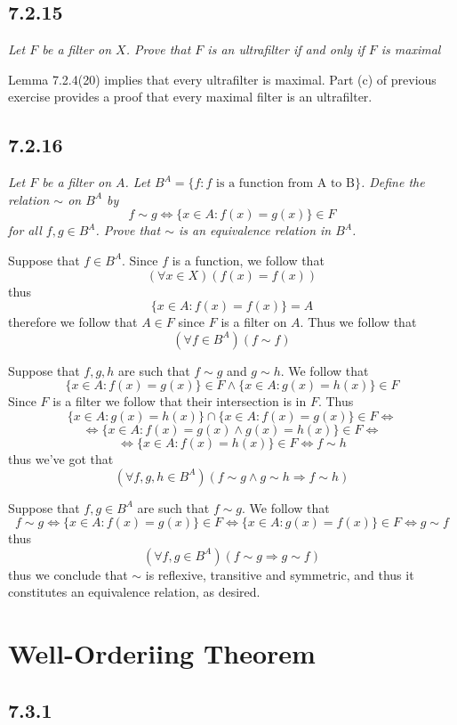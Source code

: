 \documentclass[11pt,oneside,titlepage]{book}
\DeclareMathOperator \lra {\Leftrightarrow}
\DeclareMathOperator \ra {\Rightarrow}
\newcommand{\set}[1]{\{ #1 \}}
\begin{document}
\subsection*{7.2.15}

\textit{Let $F$ be a filter on $X$. Prove that $F$ is an ultrafilter if and only if $F$ is
  maximal}

Lemma 7.2.4(20) implies that every ultrafilter is maximal. Part (c) of previous exercise provides
a proof that every maximal filter is an ultrafilter.

\subsection*{7.2.16}

\textit{Let $F$ be a filter on $A$. Let $B^A = \set{f: f \text{ is a function from A to B}}$.
Define the relation $\sim$ on $B^A$ by
$$f \sim g \iff \set{x \in A: f(x) = g(x)} \in F$$
for all $f, g \in B^A$. Prove that $\sim$ is an equivalence relation in $B^A$.}

Suppose that $f\in B^A$. Since $f$ is a function, we follow that
$$(\forall x \in X)(f(x) = f(x))$$
thus
$$\set{x \in A: f(x) = f(x)} = A$$
therefore we follow that $A \in F$ since $F$ is a filter on $A$. Thus we follow that
$$(\forall f \in B^A)(f \sim f)$$

Suppose that $f, g, h$ are such that $f \sim g$ and $g \sim h$. We follow that
$$\set{x \in A: f(x) = g(x)} \in F \land \set{x \in A: g(x) = h(x)} \in F $$
Since $F$ is a filter we follow that their intersection is in $F$. Thus 
$$\set{x \in A: g(x) = h(x)} \cap \set{x \in A: f(x) = g(x)} \in F \lra $$
$$\lra \set{x \in A: f(x) = g(x) \land g(x) = h(x)}\in F \lra$$
$$ \lra \set{x \in A: f(x) = h(x)}\in F \lra f \sim h$$
thus we've got that
$$(\forall f, g, h \in B^A)(f \sim g \land g \sim h \ra f \sim h)$$

Suppose that $f, g \in B^A$ are such that $f \sim g$. We follow that
$$f \sim g \lra \set{x \in A: f(x) = g(x)} \in F \lra
\set{x \in A: g(x) = f(x)} \in F \lra g \sim f$$
thus
$$(\forall f, g \in B^A)(f \sim g \ra g \sim f)$$
thus we conclude that $\sim$ is reflexive, transitive and symmetric, and thus it constitutes an
equivalence relation, as desired.

\section{Well-Orderiing Theorem}

\subsection*{7.3.1}
\end{document}
